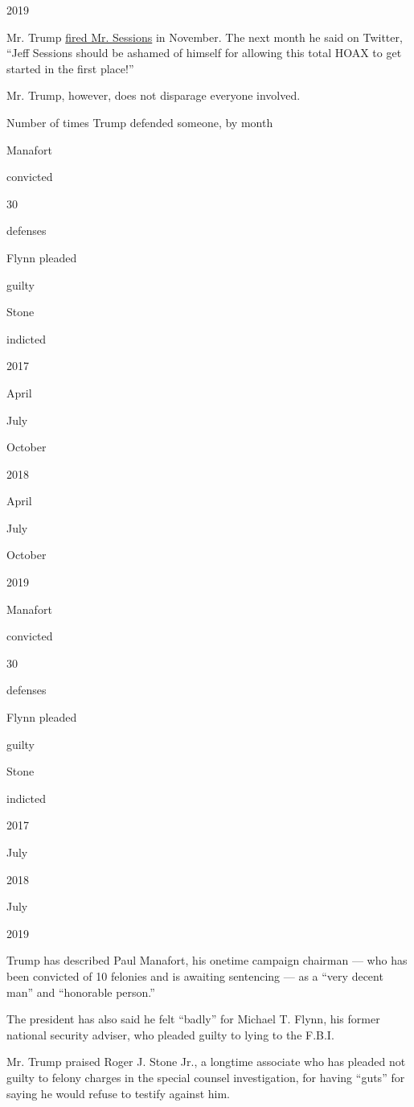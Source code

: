 2019

Mr. Trump
\href{https://www.nytimes3xbfgragh.onion/2018/11/07/us/politics/sessions-resigns.html}{fired
Mr. Sessions} in November. The next month he said on Twitter, ``Jeff
Sessions should be ashamed of himself for allowing this total HOAX to
get started in the first place!''

Mr. Trump, however, does not disparage everyone involved.

Number of times Trump defended someone, by month

Manafort

convicted

30

defenses

Flynn pleaded

guilty

Stone

indicted

2017

April

July

October

2018

April

July

October

2019

Manafort

convicted

30

defenses

Flynn pleaded

guilty

Stone

indicted

2017

July

2018

July

2019

Trump has described Paul Manafort, his onetime campaign chairman --- who
has been convicted of 10 felonies and is awaiting sentencing --- as a
``very decent man'' and ``honorable person.''

The president has also said he felt ``badly'' for Michael T. Flynn, his
former national security adviser, who pleaded guilty to lying to the
F.B.I.

Mr. Trump praised Roger J. Stone Jr., a longtime associate who has
pleaded not guilty to felony charges in the special counsel
investigation, for having ``guts'' for saying he would refuse to testify
against him.

